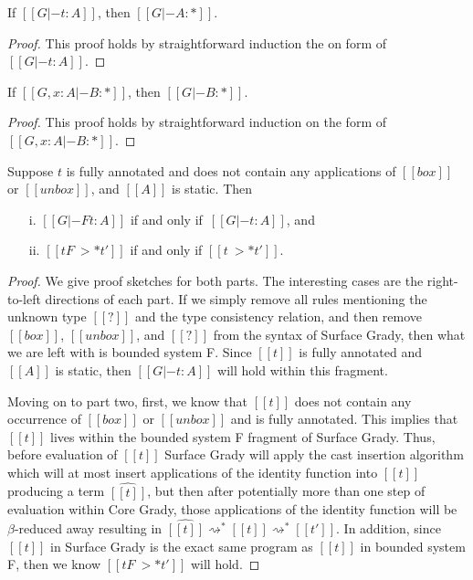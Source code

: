 \begin{lemma}
  \label{lemma:kinding_for_typing}
  If $[[G |- t : A]]$, then $[[G |- A : *]]$.
\end{lemma}
\begin{proof}
  This proof holds by straightforward induction the on form of $[[G |- t : A]]$.
\end{proof}

\begin{lemma}
  \label{lemma:strengthening_for_kinding}
  If $[[G, x : A |- B : *]]$, then $[[G |- B : *]]$.
\end{lemma}
\begin{proof}
  This proof holds by straightforward induction on the form of $[[G, x : A |- B : *]]$.
\end{proof}

\begin{lemma}
  \label{lemma:F-inclusion}
  Suppose $t$ is fully annotated and does not contain any applications
  of $[[box]]$ or $[[unbox]]$, and $[[A]]$ is static.  Then
  \begin{itemize}
  \item[i.] $[[G |-F t : A]]$ if and only if $\,[[G |- t : A]]$, and 
  \item[ii.] $[[t F~>* t']]$ if and only if $[[t ~>* t']]$.
  \end{itemize}
\end{lemma}
\begin{proof}
  We give proof sketches for both parts.  The interesting cases are
  the right-to-left directions of each part.  If we simply remove all
  rules mentioning the unknown type $[[?]]$ and the type consistency
  relation, and then remove $[[box]]$, $[[unbox]]$, and $[[?]]$ from
  the syntax of Surface Grady, then what we are left with is bounded
  system F.  Since $[[t]]$ is fully annotated and $[[A]]$ is static,
  then $[[G |- t : A]]$ will hold within this fragment.

  Moving on to part two, first, we know that $[[t]]$ does not contain
  any occurrence of $[[box]]$ or $[[unbox]]$ and is fully annotated.
  This implies that $[[t]]$ lives within the bounded system F fragment
  of Surface Grady. Thus, before evaluation of $[[t]]$ Surface Grady
  will apply the cast insertion algorithm which will at most insert
  applications of the identity function into $[[t]]$ producing a term
  $\widehat{[[t]]}$, but then after potentially more than one step of
  evaluation within Core Grady, those applications of the identity
  function will be $\beta$-reduced away resulting in $\widehat{[[t]]}
  \rightsquigarrow^* [[t]] \rightsquigarrow^* [[t']]$.  In addition,
  since $[[t]]$ in Surface Grady is the exact same program as $[[t]]$
  in bounded system F, then we know $[[t F~>* t']]$ will hold.
\end{proof}

